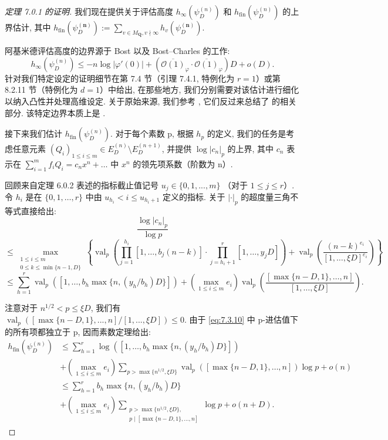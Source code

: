 \begin{proof}[定理 7.0.1 的证明]
我们现在提供关于评估高度 \(h_{\infty}(\psi_D^{(n)})\) 和 \(h_{\text{fin}}(\psi_D^{(n)})\) 的上界估计, 
其中 \(h_{\text{fin}}(\psi_D^{(\mathbf{n})}) := \sum_{v \in M_{\mathbf{Q}}, v \nmid \infty} h_v(\psi_D^{(\mathbf{n})})\).

阿基米德评估高度的边界源于 Bost 以及 Bost--Charles 的工作:
\begin{equation}\label{eq:7.3.9}
h_{\infty}(\psi_D^{(n)}) \le -n\log|\varphi'(0)| + \left(\overline{\mathcal{O}(1)}_{\varphi} \cdot \overline{\mathcal{O}(1)}_{\varphi}\right)D + o(D).
\end{equation}
针对我们特定设定的证明细节在第 7.4 节（引理 7.4.1, 特例化为 \(r=1\)）或第 8.2.11 节（特例化为 \(d=1\)）中给出, 
在那些地方, 我们分别需要对该估计进行细化以纳入凸性并处理高维设定. 
关于原始来源, 我们参考 \cite[第 127 页第 8.2 节之后的两段]{BC22}, 
它们反过来总结了 \cite{Bos20} 的相关部分. 该特定边界本质上是 \cite[第 10.5.5 节, 定理 10.5.3, 推论 10.5.4]{Bos20}.

接下来我们估计 \(h_{\text{fin}}(\psi_D^{(n)})\). 
对于每个素数 p, 根据 \(h_p\) 的定义, 我们的任务是考虑任意元素 \((Q_i)_{1 \leq i \leq m} \in E_D^{(n)} \setminus E_D^{(n+1)}\), 
并提供 \(\log |c_n|_p\) 的上界, 其中 \(c_n\) 表示在 \(\sum_{i=1}^{m} f_i Q_i = c_n x^n + \dots\) 中 \(x^n\) 的领先项系数（阶数为 n）.

回顾来自定理 6.0.2 表述的指标截止值记号 \(u_j \in \{0, 1, ..., m\}\) （对于 \(1 \le j \le r\)）. 
令 \(h_i\) 是在 \(\{0,1,\ldots,r\}\) 中由 \(u_{h_i} < i \le u_{h_i+1}\) 定义的指标. 
关于 \(|\cdot|_p\) 的超度量三角不等式直接给出:
\[ \frac{\log|c_n|_p}{\log p} \]
\begin{equation}\label{eq:7.3.10}
\leq \max_{\substack{1 \leq i \leq m \\ 0 \leq k \leq \min\{n-1,D\}}} \left\{ \operatorname{val}_{p} \left( \prod_{j=1}^{h_{i}} [1, \dots, b_{j}(n-k)] \cdot \prod_{j=h_{i}+1}^{r} [1, \dots, y_{j}D] \right) + \operatorname{val}_{p} \left( \frac{(n-k)^{e_{i}}}{[1, \dots, \xi D]^{e_{i}}} \right) \right\} 
\end{equation}
\[ \leq \sum_{h=1}^{r} \operatorname{val}_{p} \left( [1, \dots, b_{h} \max\{n, (y_{h}/b_{h})D\}] \right) + \left( \max_{1 \leq i \leq m} e_{i} \right) \operatorname{val}_{p} \left( \frac{[\max\{n-D, 1\}, \dots, n]}{[1, \dots, \xi D]} \right). \]

注意对于 \(n^{1/2} < p \leq \xi D\), 我们有 \(\operatorname{val}_p([\max\{n - D, 1\}, . . . , n]/[1, . . . , \xi D]) \leq 0\). 
由于 \eqref{eq:7.3.10} 中 p-进估值下的所有项都独立于 p, 因而素数定理给出:
\[ \begin{split} h_{\text{fin}}(\psi_D^{(n)}) &\leq \sum_{h=1}^r \log([1,\dots,b_h \max\{n,(y_h/b_h)D\}]) \\ &+ \left(\max_{1 \leq i \leq m} e_i\right) \sum_{p > \max\{n^{1/2}, \xi D\}} \operatorname{val}_p([\max\{n-D,1\},\dots,n]) \log p + o(n) \\ &\leq \sum_{h=1}^r b_h \max\{n,(y_h/b_h)D\} \\ &+ \left(\max_{1 \leq i \leq m} e_i\right) \sum_{\substack{p > \max\{n^{1/2}, \xi D\}, \\ p \mid [\max\{n-D,1\},\dots,n]}} \log p + o(n+D). \end{split} \]


\end{proof}
